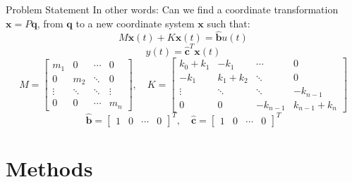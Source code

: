 \documentclass{beamer}
\begin{document}
\begin{frame}{Problem Statement}
In other words: Can we find a coordinate transformation $\mathbf{x} = P \mathbf{q}$, from $\mathbf{q}$ to a new coordinate system $\mathbf{x}$
such that:
\begin{equation}
M\ddot{\mathbf{x}}(t) + K\mathbf{x}(t) = \mathbf{\hat{b}}u(t)
\label{eq:ms1}
\end{equation}
\begin{equation}
y(t) = \mathbf{\hat{c}}^T \mathbf{x}(t)
\label{eq:ms2}
\end{equation}
\footnotesize{
$$
M = \begin{bmatrix}
m_1  &  0 & \cdots & 0 \\
0 & m_2  & \ddots & 0 \\
\vdots & \ddots & \ddots & \vdots \\
0 & 0 & \cdots & m_n \end{bmatrix}
, \quad
K = \begin{bmatrix}
k_0+k_1  &  -k_1  & \cdots & 0 \\
-k_1 & k_1+k_2   & \ddots & 0 \\
\vdots & \ddots & \ddots & -k_{n-1} \\
0 & 0  & -k_{n-1} &  k_{n-1} + k_n \end{bmatrix}
$$
$$
\mathbf{\hat{b}} = \begin{bmatrix} 1 & 0 & \cdots & 0 \end{bmatrix}^T
,\quad \mathbf{\hat{c}} = \begin{bmatrix} 1 & 0 & \cdots & 0 \end{bmatrix}^T
\label{eq:ms3}
$$
}
\end{frame}

\section{Methods}
\end{document}
